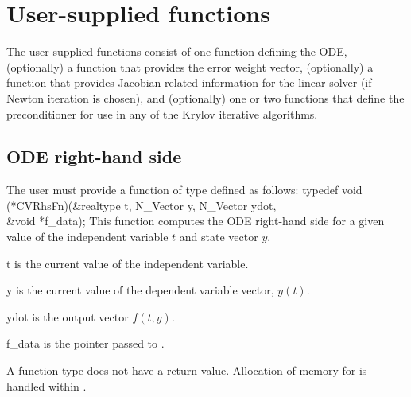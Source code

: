 \section{User-supplied functions}\label{ss:user_fct_sim}

The user-supplied functions consist of one function defining the ODE, (optionally)
a function that provides the error weight vector, (optionally) a function that
provides Jacobian-related information for the linear solver (if Newton iteration
is chosen), and (optionally) one or two functions that define the preconditioner
for use in any of the Krylov iterative algorithms.

\subsection{ODE right-hand side} \label{ss:rhsFn}
The user must provide a function of type  defined as follows:
{
  typedef void (*CVRhsFn)(&realtype t, N\_Vector y, N\_Vector ydot, \\
                          &void *f\_data);
}
{
  This function computes the ODE right-hand side for a given value
  of the independent variable $t$ and state vector $y$.
}
{
  \begin{args}[f\_data]
  \item[t]
    is the current value of the independent variable.
  \item[y]
    is the current value of the dependent variable vector, $y(t)$.
  \item[ydot]
    is the output vector $f(t,y)$.
  \item[f\_data]
    is the       
    pointer passed to .   
  \end{args}
}
{
  A  function type does not have a return value.                        
}
{
Allocation of memory for  is handled within {\cvodes}.
}

